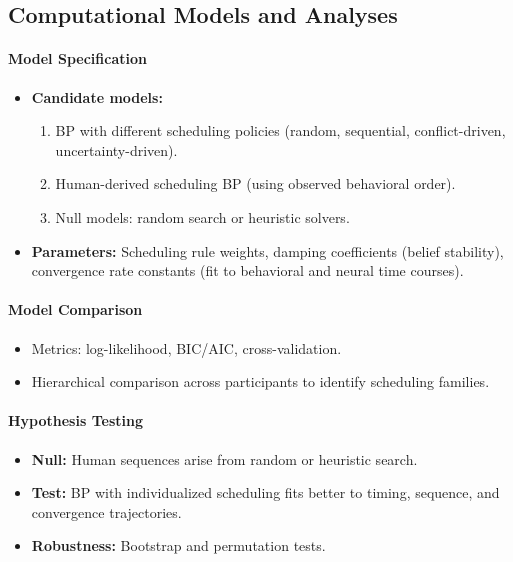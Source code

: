     \subsection{Computational Models and Analyses}
        
        \paragraph{Model Specification}
            \begin{itemize}
                \item \textbf{Candidate models:}
                      \begin{enumerate}
                          \item BP with different scheduling policies (random, sequential, conflict-driven, uncertainty-driven).
                          \item Human-derived scheduling BP (using observed behavioral order).
                          \item Null models: random search or heuristic solvers.
                      \end{enumerate}
                \item \textbf{Parameters:} Scheduling rule weights, damping coefficients (belief stability), convergence rate constants (fit to behavioral and neural time courses).
            \end{itemize}
        
        \paragraph{Model Comparison}
            \begin{itemize}
                \item Metrics: log-likelihood, BIC/AIC, cross-validation.
                \item Hierarchical comparison across participants to identify scheduling families.
            \end{itemize}

        \paragraph{Hypothesis Testing}
            \begin{itemize}
                \item \textbf{Null:} Human sequences arise from random or heuristic search.
                \item \textbf{Test:} BP with individualized scheduling fits better to timing, sequence, and convergence trajectories.
                \item \textbf{Robustness:} Bootstrap and permutation tests.
            \end{itemize}

